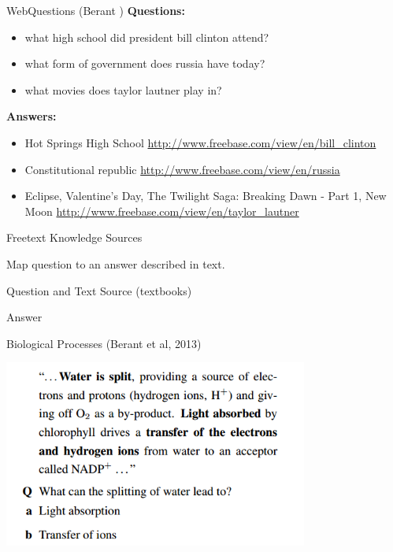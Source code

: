 \documentclass{beamer}
\begin{document}
\begin{frame}[fragile]{WebQuestions (Berant )} 
\textbf{Questions:}
\begin{itemize}
\item what high school did president bill clinton attend?
\item what form of government does russia have today?
\item what movies does taylor lautner play in?
\end{itemize}

\textbf{Answers:}
\begin{itemize}
\item Hot Springs High School \url{http://www.freebase.com/view/en/bill_clinton}
\item Constitutional republic \url{http://www.freebase.com/view/en/russia}
\item  Eclipse, Valentine's Day, The Twilight Saga: Breaking Dawn -   Part 1, New Moon \url{http://www.freebase.com/view/en/taylor_lautner}
\end{itemize}
\end{frame}

\begin{frame}{Freetext Knowledge Sources}

  \begin{description} \itemsep 20pt
  \item[Goal]Map question to an answer described in text.
  \item[Input] Question and Text Source (textbooks)
  \item[Output] Answer
  \end{description}
\end{frame}


\begin{frame}{Biological Processes (Berant et al, 2013)}
  \begin{center}
    \includegraphics[width=10cm]{water}
  \end{center}
\end{frame}
\end{document}
